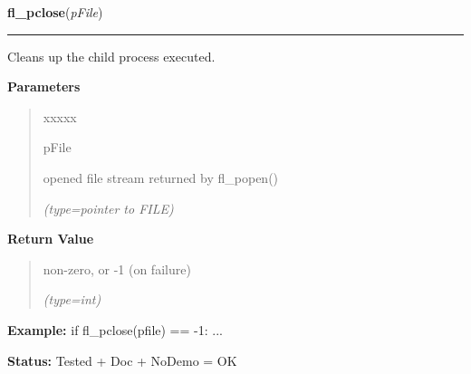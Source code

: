     \vspace{0.5ex}

\hspace{.8\funcindent}\begin{boxedminipage}{\funcwidth}

    \raggedright \textbf{fl\_pclose}(\textit{pFile})

    \vspace{-1.5ex}

    \rule{\textwidth}{0.5\fboxrule}
\setlength{\parskip}{2ex}
    Cleans up the child process executed.

\setlength{\parskip}{1ex}
      \textbf{Parameters}
      \vspace{-1ex}

      \begin{quote}
        \begin{Ventry}{xxxxx}

          \item[pFile]

          opened file stream returned by fl\_popen()

            {\it (type=pointer to FILE)}

        \end{Ventry}

      \end{quote}

      \textbf{Return Value}
    \vspace{-1ex}

      \begin{quote}
      non-zero, or -1 (on failure)

      {\it (type=int)}

      \end{quote}

\textbf{Example:} if fl\_pclose(pfile) == -1: ...



\textbf{Status:} Tested + Doc + NoDemo = OK



    \end{boxedminipage}

    \label{xformslib:flgoodies:fl_end_all_command}

    \vspace{0.5ex}

